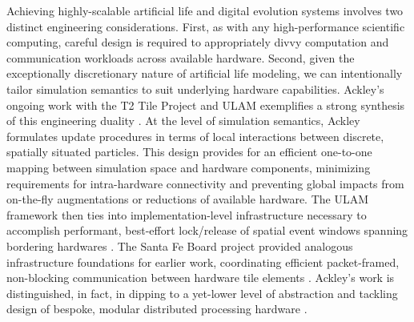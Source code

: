 Achieving highly-scalable artificial life and digital evolution systems involves two distinct engineering considerations.
First, as with any high-performance scientific computing, careful design is required to appropriately divvy computation and communication workloads across available hardware.
Second, given the exceptionally discretionary nature of artificial life modeling, we can intentionally tailor simulation semantics to suit underlying hardware capabilities.
Ackley's ongoing work with the T2 Tile Project and ULAM exemplifies a strong synthesis of this engineering duality \citep{ackley2016ulam}.
At the level of simulation semantics, Ackley formulates update procedures in terms of local interactions between discrete, spatially situated particles.
This design provides for an efficient one-to-one mapping between simulation space and hardware components, minimizing requirements for intra-hardware connectivity and preventing global impacts from on-the-fly augmentations or reductions of available hardware.
The ULAM framework then ties into implementation-level infrastructure necessary to accomplish performant, best-effort lock/release of spatial event windows spanning bordering hardwares \citep{ackley2013movable}.
The Santa Fe Board project provided analogous infrastructure foundations for earlier work, coordinating efficient packet-framed, non-blocking communication between hardware tile elements \citep{livingcomputationSFBSanta}.
Ackley's work is distinguished, in fact, in dipping to a yet-lower level of abstraction and tackling design of bespoke, modular distributed processing hardware \citep{ackley2011homeostatic,ackley2023robust}.


